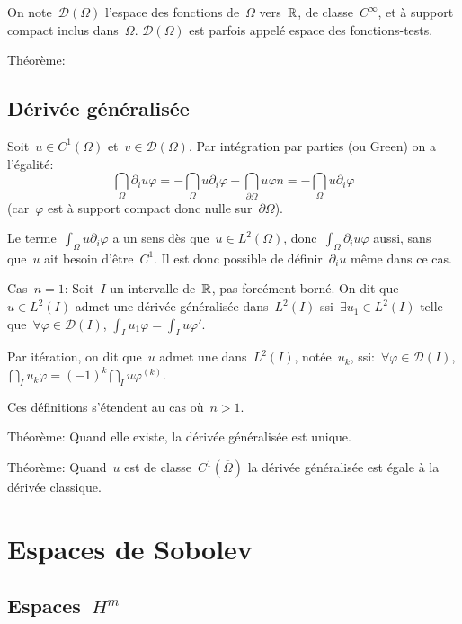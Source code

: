 On note~$\mathcal{D}(\Omega)$ l'espace des fonctions de~$\Omega$ vers~$\mathbb R$, de classe~$C^\infty$, et à support compact inclus dans~$\Omega$.
$\mathcal{D}(\Omega)$ est parfois appelé espace des fonctions-tests.

Théorème: 

\medskip
\subsection*{Dérivée généralisée}

Soit~$u\in C^1(\Omega)$ et~$v\in\mathcal{D}(\Omega)$. 
Par intégration par parties (ou Green) on a l'égalité:
\[
\dint_\Omega \partial_iu \varphi = -\dint_\Omega u \partial_i\varphi
+\dint_{\partial\Omega} u\varphi n
= -\dint_\Omega u \partial_i\varphi
\]
(car~$\varphi$ est à support compact donc nulle sur~$\partial\Omega$).

Le terme~$\int_\Omega u \partial_i\varphi$ a un sens dès que~$u\in L^2(\Omega)$,
donc~$\int_\Omega \partial_iu \varphi$ aussi, sans que~$u$ ait besoin d'être~$C^1$.
Il est donc possible de définir~$\partial_i u$ même dans ce cas.

\medskip
Cas~$n=1$: Soit~$I$ un intervalle de~$\mathbb R$, pas forcément borné. 
On dit que~$u\in L^2(I)$ admet une dérivée généralisée dans~$L^2(I)$ 
ssi~$\exists u_1\in L^2(I)$ telle que~$\forall\varphi\in\mathcal{D}(I)$,
$\int_I u_1\varphi = \int_I u\varphi'$.

Par itération, on dit que~$u$ admet une  dans~$L^2(I)$, notée~$u_k$, ssi:~$\forall\varphi\in\mathcal{D}(I)$,
$\dint_I u_k\varphi = (-1)^k\dint_I u\varphi^{(k)}$.

Ces définitions s'étendent au cas où~$n>1$.

\medskip
Théorème: Quand elle existe, la dérivée généralisée est unique.

Théorème: Quand~$u$ est de classe~$C^1(\overline{\Omega})$ la dérivée généralisée est égale à la dérivée classique.




\medskip
\section*{Espaces de Sobolev}

\medskip
\subsection*{Espaces~$H^m$}

